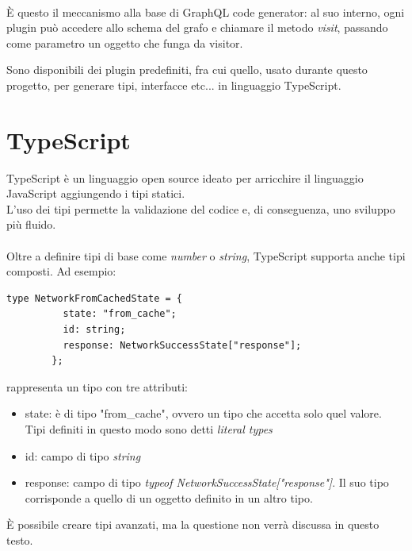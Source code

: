 \documentclass[a4paper, 12pt]{report}
\begin{document}
      \paragraph*{}È questo il meccanismo alla base di GraphQL code generator: al suo interno, ogni plugin può accedere allo schema del grafo e chiamare il metodo \emph{visit}, passando come parametro un oggetto che funga da visitor.

        Sono disponibili dei plugin predefiniti, fra cui quello, usato durante questo progetto, per generare tipi, interfacce etc... in linguaggio TypeScript.

    \newpage
    \section{TypeScript}
      TypeScript è un linguaggio open source ideato per arricchire il linguaggio JavaScript aggiungendo i tipi statici.\\
      L'uso dei tipi permette la validazione del codice e, di conseguenza, uno sviluppo più fluido.
      \paragraph*{}
      Oltre a definire tipi di base come \emph{number} o \emph{string}, TypeScript supporta anche tipi composti. Ad esempio:
      \begin{Verbatim}[samepage=true]
        type NetworkFromCachedState = {
          state: "from_cache";
          id: string;
          response: NetworkSuccessState["response"];
        };
      \end{Verbatim}
      rappresenta un tipo con tre attributi:
      \begin{itemize}
        \item state: è di tipo "from_cache", ovvero un tipo che accetta solo quel valore. Tipi definiti in questo modo sono detti \emph{literal types}
        \item id: campo di tipo \emph{string}
        \item response: campo di tipo \emph{typeof NetworkSuccessState["response"]}. Il suo tipo corrisponde a quello di un oggetto definito in un altro tipo.
      \end{itemize}
      È possibile creare tipi avanzati, ma la questione non verrà discussa in questo testo.
\end{document}
